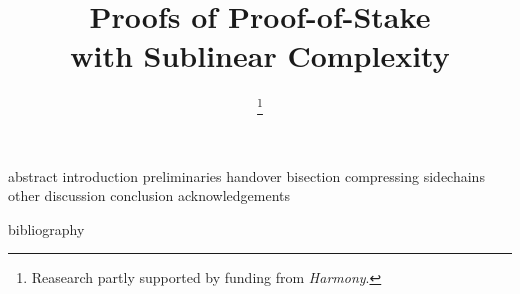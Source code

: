 \documentclass[conference]{IEEEtran}
\begin{document}
\title{Proofs of Proof-of-Stake\\with Sublinear Complexity}

\ifanonymous\else
\author{\thanks{Reasearch partly supported by funding from \emph{Harmony}.}
}
\fi

\IEEEoverridecommandlockouts
\makeatletter{}\makeatother
{}

\maketitle

{abstract}
{introduction}
{preliminaries}
{handover}
{bisection}
{compressing}
{sidechains}
{other}
{discussion}
{conclusion}
\ifanonymous\else
{acknowledgements}
\fi

{bibliography}
\end{document}
